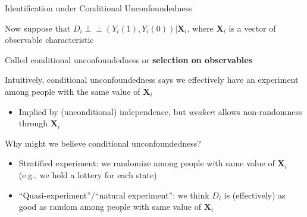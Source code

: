 \documentclass[11pt,english,handout]{beamer}
\newenvironment{wideitemize}{\itemize\addtolength{\itemsep}{10pt}}{\enditemize}
\newcommand{\indep}{\perp\!\!\!\!\perp}
\begin{document}
\begin{frame}{Identification under Conditional Unconfoundedness}
	\begin{wideitemize}
		\item
		Now suppose that $D_i \indep (Y_i(1), Y_i(0)) | \mathbf{X}_i$, where $\mathbf{X}_i$ is a vector of observable characteristic
		
		\item
		Called conditional unconfoundedness or \textbf{selection on observables}
		
		\pause
		\item
		Intuitively, conditional unconfoundedness says we effectively have an experiment among people with the same value of $\mathbf{X}_i$
\begin{itemize}
\item Implied by (unconditional) independence, but \emph{weaker}: allows non-randomness through $\mathbf{X}_i$
\end{itemize}
		
		\pause
		\item 
		Why might we believe conditional unconfoundedness? 
		\begin{itemize}
			\item 
			Stratified experiment: we randomize among people with same value of $\mathbf{X}_i$ (e.g., we hold a lottery for each state)
			
			\medskip
			\pause
			\item
			``Quasi-experiment''/``natural experiment'': we think $D_i$ is (effectively) as good as random among people with same value of $\mathbf{X}_i$
		\end{itemize}
	\end{wideitemize}
\end{frame}
\end{document}
